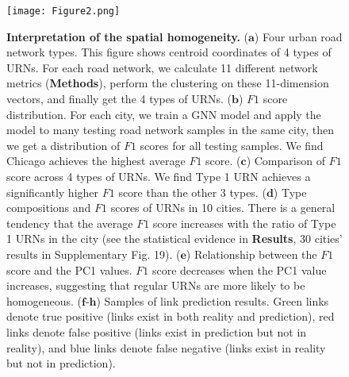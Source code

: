 \documentclass[10pt]{wlscirep}
\begin{document}
\begin{figure}[H]
\centering
\begin{minipage}{1.00\textwidth}
    \centering
  \texttt{[image: Figure2.png]}
  \label{fig:2}
\end{minipage}
\caption{\footnotesize
\textbf{Interpretation of the spatial homogeneity.} ($\textbf{a}$) Four urban road network types. This figure shows centroid coordinates of 4 types of URNs. For each road network, we calculate 11 different network metrics (\textbf{Methods}), perform the clustering on these 11-dimension vectors, and finally get the 4 types of URNs. ($\textbf{b}$) $F1$ score distribution. For each city, we train a GNN model and apply the model to many testing road network samples in the same city, then we get a distribution of $F1$ scores for all testing samples. We find Chicago achieves the highest average $F1$ score. ($\textbf{c}$) Comparison of $F1$ score across 4 types of URNs. We find Type 1 URN achieves a significantly higher $F1$ score than the other 3 types. ($\textbf{d}$) Type compositions and $F1$ scores of URNs in 10 cities. There is a general tendency that the average $F1$ score increases with the ratio of Type 1 URNs in the city (see the statistical evidence in \textbf{Results}, 30 cities' results in Supplementary Fig. 19). ($\textbf{e}$) Relationship between the $F1$ score and the PC1 values. $F1$ score decreases when the PC1 value increases, suggesting that regular URNs are more likely to be homogeneous. ($\textbf{f}$-$\textbf{h}$) Samples of link prediction results. Green links denote true positive (links exist in both reality and prediction), red links denote false positive (links exist in prediction but not in reality), and blue links denote false negative (links exist in reality but not in prediction).
}
\label{fig:2}
\end{figure}
\end{document}
